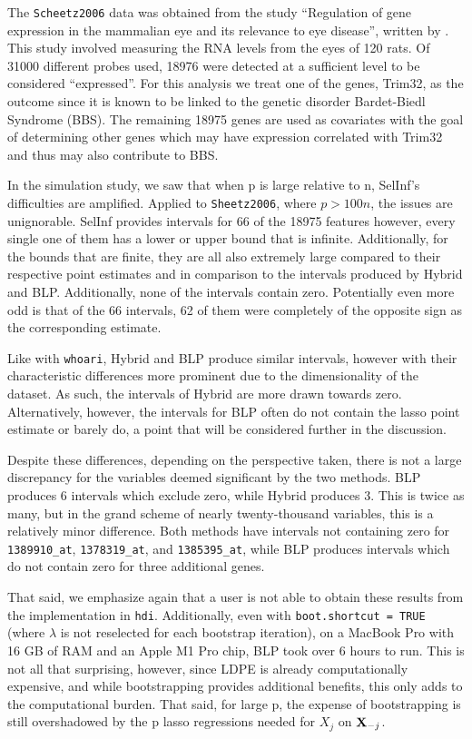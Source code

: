 The \texttt{Scheetz2006} data was obtained from the study ``Regulation of gene expression in the mammalian eye and its relevance to eye disease'', written by \cite{Scheetz2006}. This study involved measuring the RNA levels from the eyes of 120 rats. Of 31000 different probes used, 18976 were detected at a sufficient level to be considered ``expressed''. For this analysis we treat one of the genes, Trim32, as the outcome since it is known to be linked to the genetic disorder Bardet-Biedl Syndrome (BBS). The remaining 18975 genes are used as covariates with the goal of determining other genes which may have expression correlated with Trim32 and thus may also contribute to BBS.

In the simulation study, we saw that when p is large relative to n, SelInf's difficulties are amplified. Applied to \texttt{Sheetz2006}, where $p > 100n$, the issues are unignorable. SelInf provides intervals for 66 of the 18975 features however, every single one of them has a lower or upper bound that is infinite. Additionally, for the bounds that are finite, they are all also extremely large compared to their respective point estimates and in comparison to the intervals produced by Hybrid and BLP. Additionally, none of the intervals contain zero. Potentially even more odd is that of the 66 intervals, 62 of them were completely of the opposite sign as the corresponding estimate.

Like with \texttt{whoari}, Hybrid and BLP produce similar intervals, however with their characteristic differences more prominent due to the dimensionality of the dataset. As such, the intervals of Hybrid are more drawn towards zero. Alternatively, however, the intervals for BLP often do not contain the lasso point estimate or barely do, a point that will be considered further in the discussion.

Despite these differences, depending on the perspective taken, there is not a large discrepancy for the variables deemed significant by the two methods. BLP produces 6 intervals which exclude zero, while Hybrid produces 3. This is twice as many, but in the grand scheme of nearly twenty-thousand variables, this is a relatively minor difference. Both methods have intervals not containing zero for \texttt{1389910\_at}, \texttt{1378319\_at}, and \texttt{1385395\_at}, while BLP produces intervals which do not contain zero for three additional genes.

That said, we emphasize again that a user is not able to obtain these results from the implementation in \texttt{hdi}. Additionally, even with \texttt{boot.shortcut = TRUE} (where $\lambda$ is not reselected for each bootstrap iteration), on a MacBook Pro with 16 GB of RAM and an Apple M1 Pro chip, BLP took over 6 hours to run. This is not all that surprising, however, since LDPE is already computationally expensive, and while bootstrapping provides additional benefits, this only adds to the computational burden. That said, for large p, the expense of bootstrapping is still overshadowed by the p lasso regressions needed for $X_j$ on $\mathbf{X}_{-j}$. 

